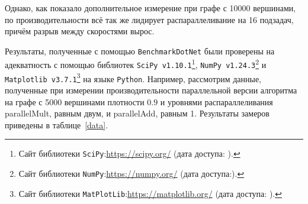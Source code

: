 \begin{table}[h]
\centering
    \caption{Сравнение производительности алгоритма обхода в ширину при распараллеливании на 16 и 64 подзадачи для функции умножения. Графа \texttt{SpeedUp} показывает отношение скорости работы алгоритма при 64 подзадачах к скорости работы при 16 подзадачах.}
    \label{bfsmaxgraph}
\end{table}

Однако, как показало дополнительное измерение при графе с 10000 вершинами, по производительности всё так же лидирует распараллеливание на 16 подзадач, причём разрыв между скоростями вырос.

Результаты, полученные с помощью \texttt{BenchmarkDotNet} были проверены на адекватность с помощью библиотек \texttt{SciPy v1.10.1}\footnote{Сайт библиотеки \texttt{SciPy}:\url{https://scipy.org/} (дата доступа:   ).}, \texttt{NumPy v1.24.3}\footnote{Сайт библиотеки \texttt{NumPy}:\url{https://numpy.org/} (дата доступа:).} и \texttt{Matplotlib v3.7.1}\footnote{Сайт библиотеки \texttt{MatPlotLib}:\url{https://matplotlib.org/} (дата доступа:   ).} на языке \texttt{Python}. Например, рассмотрим данные, полученные при измерении производительности параллельной версии алгоритма на графе с 5000 вершинами плотности $0.9$ и уровнями распараллеливания parallelMult, равным двум, и parallelAdd, равным 1. Результаты замеров приведены в таблице~\ref{data}. 

